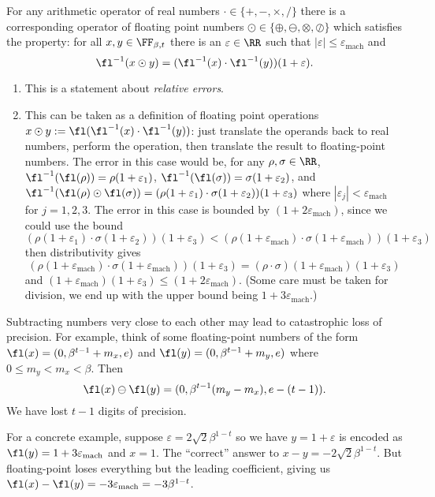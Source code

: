 \begin{fundamentalAxiomFloat}
For any arithmetic operator of real numbers $\cdot\in\{+,-,\times,/\}$ there
is a corresponding operator of floating point numbers $\odot\in\{\oplus,\ominus,\otimes,\oslash\}$
which satisfies the property: for all $x,y\in\FF_{\beta,t}$ there is an
$\varepsilon\in\RR$ such that $|\varepsilon|\leq\varepsilon_{\text{mach}}$ and
\begin{equation}
  \fl^{-1}(x\odot y) = (\fl^{-1}(x)\cdot\fl^{-1}(y))(1 + \varepsilon).
\end{equation}
\end{fundamentalAxiomFloat}
\begin{rmk}
  \begin{enumerate}
  \item This is a statement about \emph{relative errors}.
  \item This can be taken as a definition of floating point operations
    $x\odot y := \fl(\fl^{-1}(x)\cdot\fl^{-1}(y))$: just translate the
    operands back to real numbers, perform the operation, then translate
    the result to floating-point numbers. The error in this case would
    be, for any $\rho,\sigma\in\RR$,
    $\fl^{-1}(\fl(\rho))=\rho(1+\varepsilon_{1})$,
    $\fl^{-1}(\fl(\sigma))=\sigma(1+\varepsilon_{2})$, and $\fl^{-1}(\fl(\rho)\odot\fl(\sigma))=(\rho(1+\varepsilon_{1})\cdot\sigma(1+\varepsilon_{2}))(1+\varepsilon_{3})$
    where $|\varepsilon_{j}|<\varepsilon_{\text{mach}}$ for
    $j=1,2,3$. The error in this case is bounded by $(1 + 2\varepsilon_{\text{mach}})$,
    since we could use the bound
    $$(\rho(1+\varepsilon_{1})\cdot\sigma(1+\varepsilon_{2}))(1+\varepsilon_{3})<(\rho(1+\varepsilon_{\text{mach}})\cdot\sigma(1+\varepsilon_{\text{mach}}))(1+\varepsilon_{3})$$
    then distributivity gives $$(\rho(1+\varepsilon_{\text{mach}})\cdot\sigma(1+\varepsilon_{\text{mach}}))(1+\varepsilon_{3})=(\rho\cdot\sigma)(1+\varepsilon_{\text{mach}})(1+\varepsilon_{3})$$
    and $(1+\varepsilon_{\text{mach}})(1+\varepsilon_{3})\leq(1 + 2\varepsilon_{\text{mach}})$.
    (Some care must be taken for division, we end up with the upper
    bound being $1+3\varepsilon_{\text{mach}}$.)
  \end{enumerate}
\end{rmk}
\begin{note}
Subtracting numbers very close to each other may lead to catastrophic
loss of precision. For example, think of some floating-point numbers of
the form $\fl(x)=(0,\beta^{t-1}+m_x,e)$ and $\fl(y)=(0,\beta^{t-1}+m_{y},e)$ where $0\leq m_{y}<m_{x}<\beta$.
Then
\begin{equation}
  \fl(x)\ominus\fl(y) = (0,\beta^{t-1}(m_{y}-m_{x}),e-(t-1)).
\end{equation}
We have lost $t-1$ digits of precision.

For a concrete example, suppose $\varepsilon=2\sqrt{2}\beta^{1-t}$ so we
have $y=1+\varepsilon$ is encoded as
$\fl(y)=1+3\varepsilon_{\text{mach}}$ and $x=1$. The ``correct'' answer
to $x-y=-2\sqrt{2}\beta^{1-t}$. But floating-point loses
everything but the leading coefficient, giving us
$\fl(x)-\fl(y)=-3\varepsilon_{\text{mach}} = -3\beta^{1-t}$.
\end{note}

